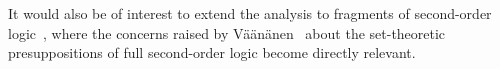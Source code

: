 \documentclass[reqno]{asl}
\begin{document}
It would also be of interest to extend the analysis to fragments of
second-order logic~\cite{gheorghiu2025prooftheoreticsemanticssecondorderlogic},
where the concerns raised by V\"{a}\"{a}n\"{a}nen~\cite{vaananen2012second}
about the set-theoretic presuppositions of full second-order logic become
directly relevant.



\end{document}
